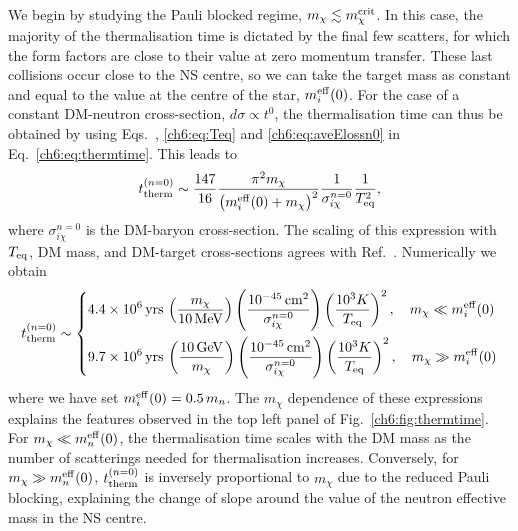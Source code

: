 We begin by studying the Pauli blocked regime, $m_\chi \lesssim m_\chi^{\rm crit}$. 
In this case, the majority of the thermalisation time is dictated by the final few scatters, for which the form factors are close to their value at zero momentum transfer.  These last collisions occur close to the NS centre, so we can take the target mass as constant and equal to the value at the centre of the star, $m_i^{\rm eff}(0)$. For the case of a constant DM-neutron cross-section, $d\sigma \propto t^0$, the thermalisation time can thus be obtained by using  Eqs.~, \ref{ch6:eq:Teq} and \ref{ch6:eq:aveElossn0} in Eq.~\ref{ch6:eq:thermtime}. This leads to
%
\footnotesize
\begin{equation}
  t_{\rm therm}^{(n=0)} \sim   \frac{147}{16 }\frac{\pi^2 m_\chi}{ \left(m_i^{\rm eff}(0) + m_\chi\right)^2}\frac{1}{\sigma_{i\chi}^{n=0}}\frac{1}{T_{\rm eq}^2}, 
  \label{ch6:eq:thermtimen0}
\end{equation} 
\normalsize
%
where $\sigma_{i\chi}^{n=0}$ is the DM-baryon cross-section. 
The scaling of this expression with $T_{\rm eq}$, DM mass, and DM-target cross-sections 
agrees with Ref.~\cite{Bertoni:2013bsa_dec_DarkMatterThermalization}. 
Numerically we obtain
\footnotesize
\begin{equation}
  t_{\rm therm}^{(n=0)} \sim \begin{dcases}
    4.4\times 10^{6}{\rm \,yrs} \, \left(\frac{m_\chi}{10{\rm \,MeV}}\right)\left(\frac{10^{-45}{\rm \,cm}^2}{\sigma_{i\chi}^{n=0}}\right)\left(\frac{10^3K}{T_{\rm eq}}\right)^{2},\quad m_\chi \ll m_i^{\rm eff}(0)\\
    9.7\times 10^{6}{\rm \,yrs} \, \left(\frac{10{\rm \,GeV}}{m_\chi}\right)\left(\frac{10^{-45}{\rm \,cm}^2}{\sigma_{i\chi}^{n=0}}\right)\left(\frac{10^3K}{T_{\rm eq}}\right)^{2},\quad m_\chi \gg m_i^{\rm eff}(0)
  \end{dcases} \label{ch6:eq:t_therm_0}
\end{equation}
\normalsize
%
where we have set $m_i^{\rm eff}(0) = 0.5\,m_n$. 
The $m_\chi$ dependence of these expressions explains the features observed in the top left panel of Fig.~\ref{ch6:fig:thermtime}. For $m_\chi \ll m_n^{\rm eff}(0)$, the thermalisation time scales with the DM mass as the number of scatterings needed for thermalisation increases. Conversely, for $m_\chi \gg m_n^{\rm eff}(0)$, $t_{\rm therm}^{(n=0)}$ is inversely proportional to $m_\chi$ due to the reduced Pauli blocking, explaining the change of slope around the value of the neutron effective mass in the NS centre. 




